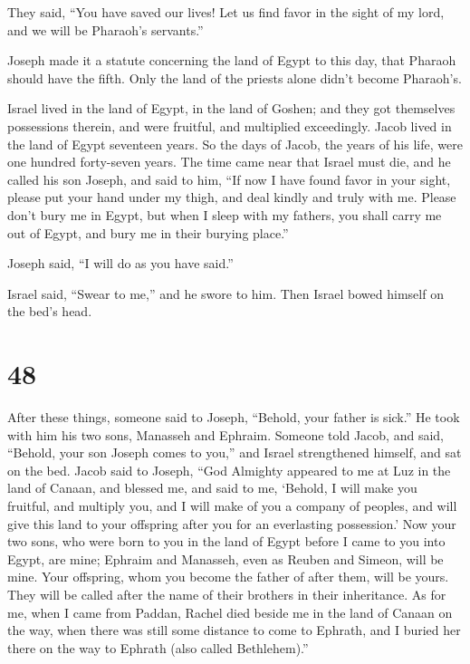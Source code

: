  They said, ``You have saved our lives! Let us find favor
in the sight of my lord, and we will be Pharaoh's servants.''

 Joseph made it a statute concerning the land of Egypt to
this day, that Pharaoh should have the fifth. Only the land of the
priests alone didn't become Pharaoh's.

 Israel lived in the land of Egypt, in the land of
Goshen; and they got themselves possessions therein, and were fruitful,
and multiplied exceedingly.  Jacob lived in the land of
Egypt seventeen years. So the days of Jacob, the years of his life, were
one hundred forty-seven years.  The time came near that
Israel must die, and he called his son Joseph, and said to him, ``If now
I have found favor in your sight, please put your hand under my thigh,
and deal kindly and truly with me. Please don't bury me in Egypt,
 but when I sleep with my fathers, you shall carry me out
of Egypt, and bury me in their burying place.''

Joseph said, ``I will do as you have said.''

 Israel said, ``Swear to me,'' and he swore to him. Then
Israel bowed himself on the bed's head.

\hypertarget{section-47}{%
\section{48}\label{section-47}}

 After these things, someone said to Joseph, ``Behold,
your father is sick.'' He took with him his two sons, Manasseh and
Ephraim.  Someone told Jacob, and said, ``Behold, your son
Joseph comes to you,'' and Israel strengthened himself, and sat on the
bed.  Jacob said to Joseph, ``God Almighty appeared to me
at Luz in the land of Canaan, and blessed me,  and said to
me, `Behold, I will make you fruitful, and multiply you, and I will make
of you a company of peoples, and will give this land to your offspring
after you for an everlasting possession.'  Now your two
sons, who were born to you in the land of Egypt before I came to you
into Egypt, are mine; Ephraim and Manasseh, even as Reuben and Simeon,
will be mine.  Your offspring, whom you become the father
of after them, will be yours. They will be called after the name of
their brothers in their inheritance.  As for me, when I
came from Paddan, Rachel died beside me in the land of Canaan on the
way, when there was still some distance to come to Ephrath, and I buried
her there on the way to Ephrath (also called Bethlehem).''

